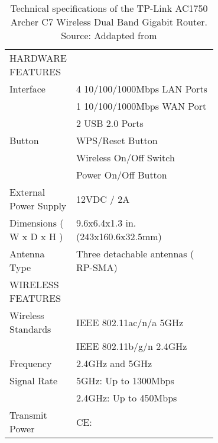 \begin{longtable}{lp{0.7\linewidth}}		
\caption{Technical specifications of the TP-Link AC1750 Archer C7 Wireless Dual Band Gigabit Router. Source: Addapted from \cite{TPLINK2017AC1750}} \\ \hline
		HARDWARE FEATURES 		 		 		 		 & \\ 
		Interface 		 		 		 		 & 4 10/100/1000Mbps LAN Ports\\
													 & 1 10/100/1000Mbps WAN Port\\
													 & 2 USB 2.0 Ports \\
		Button 		 		 		 		 & WPS/Reset Button\\
												 & Wireless On/Off Switch \\
												 & Power On/Off Button \\
		External Power Supply 		 		 		 		 & 12VDC / 2A \\
		Dimensions ( W x D x H ) 		 		 		 		 & 9.6x6.4x1.3 in. (243x160.6x32.5mm) \\
		Antenna Type 		 		 		 		 & Three detachable antennas ( RP-SMA) \\ \hline
		WIRELESS FEATURES 		 		 		 		 & \\
		Wireless Standards 		 		 		 		 & IEEE 802.11ac/n/a 5GHz\\
																	 & IEEE 802.11b/g/n 2.4GHz \\
		Frequency 		 		 		 		 & 2.4GHz and 5GHz \\
		Signal Rate 		 		 		 		 		 & 5GHz: Up to 1300Mbps \\ 
		                                                    & 2.4GHz:  Up to 450Mbps \\
		Transmit Power 		 		 		 		 		 & CE: \\

\end{longtable}
